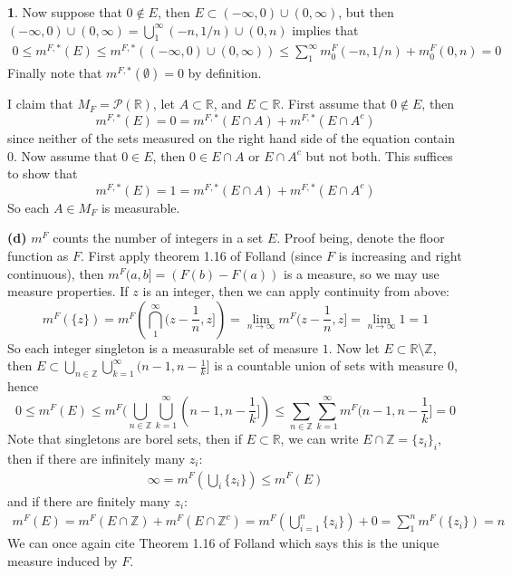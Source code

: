 \documentclass[10.5pt]{article}
\theoremstyle{definition}
\newtheorem{pb}{}
\newcommand{\set}[1]{\{#1\}}
\newcommand{\tor}{\text{ or }}
\begin{document}
\begin{pb}
        Now suppose that \(0 \not \in E\), then \(E \subset (- \infty, 0) \cup (0,\infty)\), but then \((- \infty, 0) \cup (0,\infty) = \bigcup_1^\infty (-n, 1/n) \cup (0,n)\)
        implies that
        \begin{align*}
            0 \leq m^{F,*}(E) \leq m^{F,*}((- \infty, 0) \cup (0,\infty)) 
            \leq \sum_1^\infty m^F_0(-n, 1/n) + m^F_0(0,n) = 0
        \end{align*}
        Finally note that \(m^{F,*}(\emptyset) = 0\) by definition.

        I claim that \(M_F = \mathcal{P}(\mathbb{R})\), let \(A \subset \mathbb{R}\), and \(E \subset \mathbb{R}\). First assume that \(0 \not \in E\), then
        \[m^{F,*}(E) = 0 = m^{F,*}(E \cap A) + m^{F,*}(E \cap A^c)\]
        since neither of the sets measured on the right hand side of the equation contain 0. Now assume that \(0 \in E\), then \(0 \in E \cap A \tor E \cap A^c\) but not both.
        This suffices to show that
        \[m^{F,*}(E) = 1 = m^{F,*}(E \cap A) + m^{F,*}(E \cap A^c)\]
        So each \(A \in M_F\) is measurable.

        \textbf{(d)} \(m^F\) counts the number of integers in a set \(E\). Proof being, denote the floor function as \(F\).
        First apply theorem 1.16 of Folland (since \(F\) is increasing and right continuous), then \(m^F(a,b] = (F(b) - F(a))\) is a measure, so we may use measure properties.
        If \(z\) is an integer, then we can apply continuity from above:
        \[m^F(\set{z}) = m^F \left(\bigcap_1^\infty (z-\frac1n,z]\right) = \lim_{n\to\infty}m^F(z-\frac1n,z] = \lim_{n\to\infty}1 = 1\]
        So each integer singleton is a measurable set of measure \(1\). Now let \(E \subset \mathbb{R}\setminus\mathbb{Z}\), then \newline
        \(E \subset \bigcup_{n \in \mathbb{Z}}\bigcup_{k=1}^\infty(n-1,n-\frac{1}{k}]\) is a countable union of sets with measure \(0\), hence
        \[0 \leq m^F(E) \leq m^F (\bigcup_{n \in \mathbb{Z}}\bigcup_{k=1}^\infty(n-1,n-\frac{1}{k}]) \leq \sum_{n\in \mathbb{Z}}\sum_{k=1}^\infty m^F(n-1,n-\frac{1}{k}] = 0\]
        Note that singletons are borel sets, then if \(E \subset \mathbb{R}\), we can write \(E \cap \mathbb{Z} = \set{z_i}_i\), then if there are infinitely many \(z_i\):
        \begin{align*}
            \infty = m^F\left(\bigcup_i\set{z_i}\right) \leq m^F(E)
        \end{align*}
        and if there are finitely many \(z_i\):
        \begin{align*}
            m^F(E) = m^F\left(E \cap \mathbb{Z}\right) + m^F\left(E \cap \mathbb{Z}^c\right) = m^F\left(\bigcup_{i=1}^n \set{z_i}\right) + 0 = \sum_1^n m^F(\set{z_i}) = n
        \end{align*}
        We can once again cite Theorem 1.16 of Folland which says this is the unique measure induced by \(F\).
    \end{pb}
\end{document}
